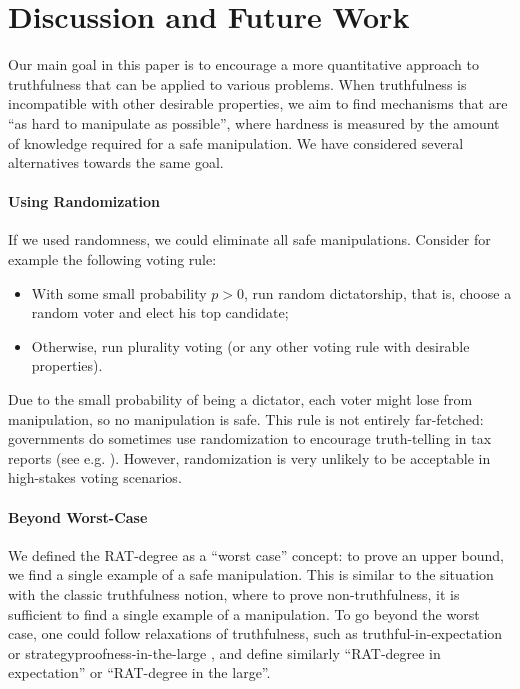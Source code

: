 \section{Discussion and Future Work}\label{sec:discussion}

Our main goal in this paper is to encourage a more quantitative approach to truthfulness that can be applied to various problems. When truthfulness is incompatible with other desirable properties, we aim to find mechanisms that are ``as hard to manipulate as possible'', where hardness is measured by the amount of knowledge required for a safe manipulation. We have considered several alternatives towards the same goal.

\paragraph{Using Randomization} If we used randomness, we could eliminate all safe manipulations. Consider for example the following voting rule:
\begin{itemize}
\item With some small probability $p>0$, run random dictatorship, that is, choose a random voter and elect his top candidate;
\item Otherwise, run plurality voting (or any other voting rule with desirable properties).
\end{itemize}
Due to the small probability of being a dictator, each voter might lose from manipulation, so no manipulation is safe. 
This rule is not entirely far-fetched: governments do sometimes use randomization to encourage truth-telling in tax reports (see e.g. \cite{haan2012sound}). However, randomization is very unlikely to be acceptable in high-stakes voting scenarios.


\paragraph{Beyond Worst-Case} We defined the RAT-degree as a ``worst case'' concept: to prove an upper bound, we find a single example of a safe manipulation. This is similar to the situation with the classic truthfulness notion, where to prove non-truthfulness, it is sufficient to find a single example of a manipulation.
To go beyond the worst case, one could follow relaxations of truthfulness, such as truthful-in-expectation \cite{lavi2011truthful} or strategyproofness-in-the-large \citep{azevedo2019strategy}, and define similarly ``RAT-degree in expectation'' or ``RAT-degree in the large''. 

